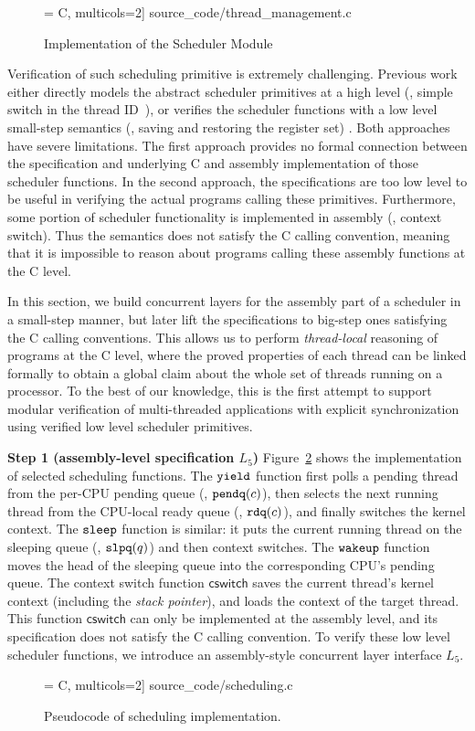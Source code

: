 {\begin{figure}[t]
 = C, multicols=2] {source_code/thread_management.c}
\caption{Implementation of the Scheduler Module}
\label{fig:exp:scheduler}
\hrulefill
    \afterpage{\FloatBarrier}
\end{figure}

Verification of such scheduling primitive is extremely challenging.
Previous work either directly models the abstract scheduler primitives at a high level
(\eg, simple switch in the thread ID~\cite{xu16}),
or verifies the scheduler functions with a low level small-step semantics
(\eg, saving and restoring the register set) \cite{dscal15}.
Both approaches have severe limitations. The first approach provides no formal connection
between the specification and underlying C and assembly implementation of those
scheduler functions. In the second approach, the specifications are too low level to
be useful in verifying the actual programs calling these primitives. Furthermore,
some portion of scheduler functionality is implemented in assembly (\eg, context switch).
Thus the semantics does not satisfy the C calling convention, meaning that it 
is impossible to reason about programs calling these assembly functions at the C level.

In this section, we build concurrent layers for the assembly part
of a scheduler in a small-step manner, but later lift the specifications
to big-step ones satisfying the C calling conventions. 
This allows us to perform \emph{thread-local} reasoning of programs
at the C level, where the proved properties of each thread can be linked formally
to obtain a global claim about the whole set of threads running on a processor.
To the best of our knowledge, this is the first attempt to support modular verification
of multi-threaded applications with explicit synchronization using verified
low level scheduler primitives.

\noindent\textbf{Step 1 (assembly-level specification $L_5$)} 
Figure~\ref{fig:exp:sched} shows the implementation
of selected scheduling functions.
The ${\texttt{yield}}$ function first polls a pending
thread from the per-CPU pending queue
(\ie, ${\texttt{pendq}}(c)$),
then selects the next running thread
from the CPU-local ready queue
(\ie, ${\texttt{rdq}}(c)$),
and finally switches the kernel context.
The ${\texttt{sleep}}$ function is similar: it
puts the current running thread
on the sleeping queue (\ie, ${\texttt{slpq}}(q)$) and
then context switches.
The ${\texttt{wakeup}}$ function moves the head of the sleeping queue
into the corresponding CPU's pending queue.
The context switch function $\mathsf{cswitch}$
saves the current thread's kernel context (including the 
\emph{stack pointer}),
and loads the context of the target thread.
This function $\mathsf{cswitch}$ can only be implemented at the assembly level,
and its specification does not satisfy the C calling convention.
To verify these low level scheduler functions, we introduce an
assembly-style concurrent layer interface $L_5$.
\begin{figure}[t]
 = C, multicols=2] {source_code/scheduling.c}
\caption{Pseudocode of scheduling implementation.}
\label{fig:exp:sched}
\hrulefill
\end{figure}


}
